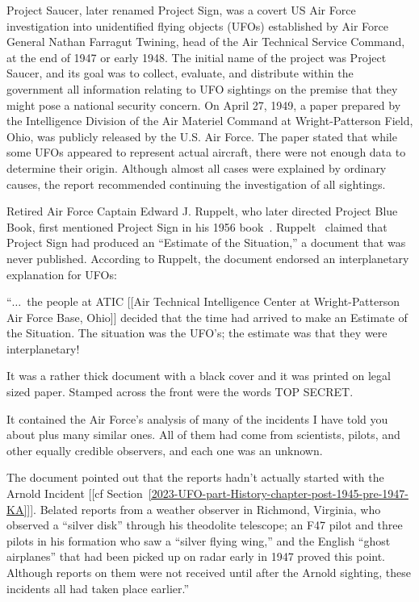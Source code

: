 Project Saucer, later renamed Project Sign, was a covert US Air Force investigation into unidentified flying objects (UFOs)
established by Air Force General Nathan Farragut Twining, head of the Air Technical Service Command,
at the end of 1947 or early 1948. The initial name of the project was Project Saucer, and its goal was to collect, evaluate, and distribute within the government all information relating to UFO sightings on the premise that they might pose a national security concern. On April 27, 1949, a paper prepared by the Intelligence Division of the Air Materiel Command at Wright-Patterson Field, Ohio, was publicly released by the U.S. Air Force. The paper stated that while some UFOs appeared to represent actual aircraft, there were not enough data to determine their origin. Although almost all cases were explained by ordinary causes, the report recommended continuing the investigation of all sightings.

Retired Air Force Captain Edward J. Ruppelt, who later directed Project Blue Book, first mentioned Project Sign in his 1956 book~\cite{Ruppelt2011May}. Ruppelt~\cite[Chapter~3]{Ruppelt2011May} claimed that Project Sign had produced an ``Estimate of the Situation,'' a document that was never published. According to Ruppelt, the document endorsed an interplanetary explanation for UFOs:
\begin{svgraybox}
``$\ldots$~the people at ATIC [[Air Technical Intelligence Center at Wright-Patterson Air Force Base, Ohio]]
decided that the time had arrived to make an Estimate        of       the Situation.
The situation was the UFO's; the estimate was that they were interplanetary!


      It was a rather thick document with a black cover and it was printed on legal sized paper. Stamped across the front were the words TOP SECRET.


      It contained the Air Force's analysis  of many  of
      the incidents I have told you about plus many similar ones.
All of them had come from scientists, pilots, and other equally credible observers, and each one was an unknown.


      The document pointed out that the reports hadn't actually started with the Arnold Incident
[[cf Section~\ref{2023-UFO-part-History-chapter-post-1945-pre-1947-KA}]].
Belated reports from a weather observer in Richmond, Virginia, who observed a
``silver disk'' through his theodolite telescope; an F47 pilot and three pilots in his formation who saw a ``silver flying wing,''
and the English ``ghost airplanes'' that had been picked up on radar early in 1947 proved this point.
Although reports on them were not received until after the
Arnold sighting, these incidents all had taken place earlier.''
\end{svgraybox}

